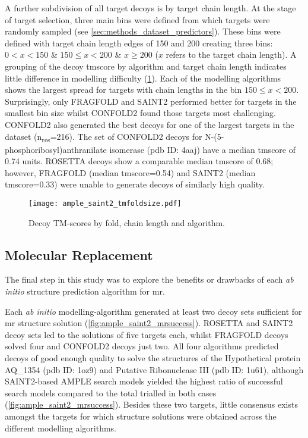 A further subdivision of all target decoys is by target chain length. At the stage of target selection, three main bins were defined from which targets were randomly sampled (see \cref{sec:methods_dataset_predictors}). These bins were defined with target chain length edges of 150 and 200 creating three bins: $0 < x < 150$ \& $150 \leq x < 200$ \& $x \geq 200$ ($x$ refers to the target chain length). A grouping of the decoy \gls{tmscore} by algorithm and target chain length indicates little difference in modelling difficulty (\cref{fig:ample_saint2_tmfoldsize}). Each of the modelling algorithms shows the largest spread for targets with chain lengths in the bin $150 \leq x < 200$. Surprisingly, only FRAGFOLD and SAINT2 performed better for targets in the smallest bin size whilst CONFOLD2 found those targets most challenging. CONFOLD2 also generated the best decoys for one of the largest targets in the dataset (n\textsubscript{res}=216). The set of CONFOLD2 decoys for N-(5-phosphoribosyl)anthranilate isomerase (\gls{pdb} ID: 4aaj) have a median \gls{tmscore} of 0.74 units. ROSETTA decoys show a comparable median \gls{tmscore} of 0.68; however, FRAGFOLD (median \gls{tmscore}=0.54) and SAINT2 (median \gls{tmscore}=0.33) were unable to generate decoys of similarly high quality.

\begin{figure}[H]
    \centering
    \texttt{[image: ample\_saint2\_tmfoldsize.pdf]}
    \caption[Decoy TM-scores by fold, chain length and algorithm]{Decoy TM-scores by fold, chain length and algorithm.}
    \label{fig:ample_saint2_tmfoldsize}
\end{figure}

\subsection{Molecular Replacement}
The final step in this study was to explore the benefits or drawbacks of each \textit{ab initio} structure prediction algorithm for \gls{mr}.

Each \textit{ab initio} modelling-algorithm generated at least two decoy sets sufficient for \gls{mr} structure solution (\cref{fig:ample_saint2_mrsuccess}). ROSETTA and SAINT2 decoy sets led to the solutions of five targets each, whilst FRAGFOLD decoys solved four and CONFOLD2 decoys just two. All four algorithms predicted decoys of good enough quality to solve the structures of the Hypothetical protein AQ\_1354 (\gls{pdb} ID: 1oz9) and Putative Ribonuclease III (\gls{pdb} ID: 1u61), although SAINT2-based AMPLE search models yielded the highest ratio of successful search models compared to the total trialled in both cases (\cref{fig:ample_saint2_mrsuccess}). Besides these two targets, little consensus exists amongst the targets for which structure solutions were obtained across the different modelling algorithms.

